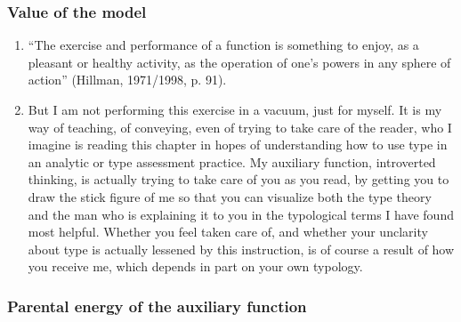 \subsubsection{Value of the model}

\begin{enumerate}

\item {} “The exercise and performance of a
function is something to enjoy, as a pleasant or healthy activity, as the
operation of one’s powers in any sphere of action” (Hillman, 1971/1998, p. 91).

\item {}
But I am not performing this exercise in a vacuum, just for myself. It is my
way of teaching, of conveying, even of trying to take care of the reader, who I
imagine is reading this chapter in hopes of understanding how to use type in an
analytic or type assessment practice. My auxiliary function, introverted
thinking, is actually trying to take care of you as you read, by getting you to
draw the stick figure of me so that you can visualize both the type theory and
the man who is explaining it to you in the typological terms I have found most
helpful. Whether you feel taken care of, and whether your unclarity about type
is actually lessened by this instruction, is of course a result of how you
receive me, which depends in part on your own typology.

\end{enumerate}

\subsubsection{Parental energy of the auxiliary function}

